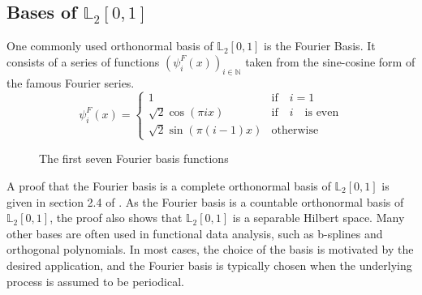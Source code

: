 \documentclass[12pt, a4paper]{article}
\theoremstyle{MAstyle} \newtheorem{assumption}{Assumption}[section]
\theoremstyle{MAstyle} \newtheorem{definition}{Definition}[section]
\theoremstyle{MAstyle} \newtheorem{theorem}{Theorem}[section]
\begin{document}
		\subsection{Bases of $\mathbb{L}_2[0,1]$}\label{bases_L2}
			One commonly used orthonormal basis of $\mathbb{L}_2[0,1]$ is the Fourier Basis. It consists of a series of functions $\left(\psi_{i}^{F}(x)\right)_{i \in \mathbb{N}}$ taken from the sine-cosine form of the famous Fourier series.
			\begin{equation}
				\psi_{i}^{F}(x) = 
				\begin{cases}
					1 & \text{if} \quad i = 1\\
					\sqrt{2} \cos(\pi i x) & \text{if} \quad i \quad \text{is even} \\
					\sqrt{2} \sin(\pi (i-1)x) & \text{otherwise}
				\end{cases}
			\end{equation}
			\begin{figure}[H]
				\caption{The first seven Fourier basis functions}
				\label{fourier_basis}
			\end{figure}
			A proof that the Fourier basis is a complete orthonormal basis of $\mathbb{L}_2[0,1]$ is given in section 2.4 of \cite{hsing_theoretical_2015}. As the Fourier basis is a countable orthonormal basis of $\mathbb{L}_2[0,1]$, the proof also shows that $\mathbb{L}_2[0,1]$ is a separable Hilbert space.
			Many other bases are often used in functional data analysis, such as b-splines and orthogonal polynomials. In most cases, the choice of the basis is motivated by the desired application, and the Fourier basis is typically chosen when the underlying process is assumed to be periodical.
	
\end{document}
